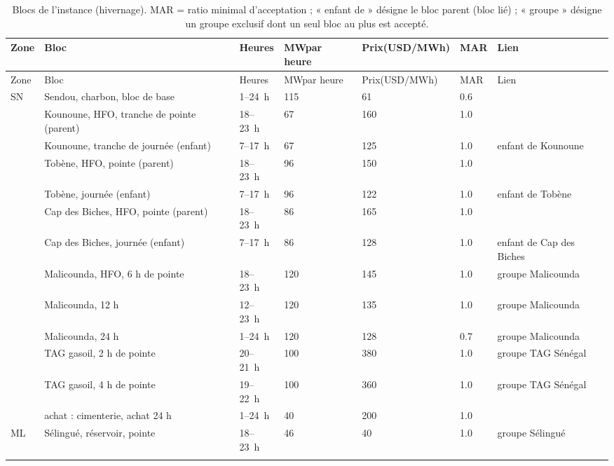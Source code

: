 \begin{longtable}{p{1.0cm}p{5.4cm}p{1.6cm}p{1.5cm}p{1.7cm}p{0.9cm}p{2.7cm}}
\caption{Blocs de l'instance (hivernage). MAR = ratio minimal d'acceptation ; « enfant de » désigne le bloc parent (bloc lié) ; « groupe » désigne un groupe exclusif dont un seul bloc au plus est accepté.}\label{tab:annexe-blocs}\\
\toprule Zone & Bloc & Heures & MW\newline par heure & Prix\newline (USD/MWh) & MAR & Lien \\ \midrule \endfirsthead
\toprule Zone & Bloc & Heures & MW\newline par heure & Prix\newline (USD/MWh) & MAR & Lien \\ \midrule \endhead
\bottomrule \endfoot
SN & Sendou, charbon, bloc de base & 1--24~h & 115 & 61 & 0.6 &  \\ \rowsep
 & Kounoune, HFO, tranche de pointe (parent) & 18--23~h & 67 & 160 & 1.0 &  \\ \rowsep
 & Kounoune, tranche de journée (enfant) & 7--17~h & 67 & 125 & 1.0 & enfant de Kounoune \\ \rowsep
 & Tobène, HFO, pointe (parent) & 18--23~h & 96 & 150 & 1.0 &  \\ \rowsep
 & Tobène, journée (enfant) & 7--17~h & 96 & 122 & 1.0 & enfant de Tobène \\ \rowsep
 & Cap des Biches, HFO, pointe (parent) & 18--23~h & 86 & 165 & 1.0 &  \\ \rowsep
 & Cap des Biches, journée (enfant) & 7--17~h & 86 & 128 & 1.0 & enfant de Cap des Biches \\ \rowsep
 & Malicounda, HFO, 6 h de pointe & 18--23~h & 120 & 145 & 1.0 & groupe Malicounda \\ \rowsep
 & Malicounda, 12 h & 12--23~h & 120 & 135 & 1.0 & groupe Malicounda \\ \rowsep
 & Malicounda, 24 h & 1--24~h & 120 & 128 & 0.7 & groupe Malicounda \\ \rowsep
 & TAG gasoil, 2 h de pointe & 20--21~h & 100 & 380 & 1.0 & groupe TAG Sénégal \\ \rowsep
 & TAG gasoil, 4 h de pointe & 19--22~h & 100 & 360 & 1.0 & groupe TAG Sénégal \\ \rowsep
 & achat : cimenterie, achat 24 h & 1--24~h & 40 & 200 & 1.0 &  \\ \rowsep
ML & Sélingué, réservoir, pointe & 18--23~h & 46 & 40 & 1.0 & groupe Sélingué \\ \rowsep

\end{longtable}
